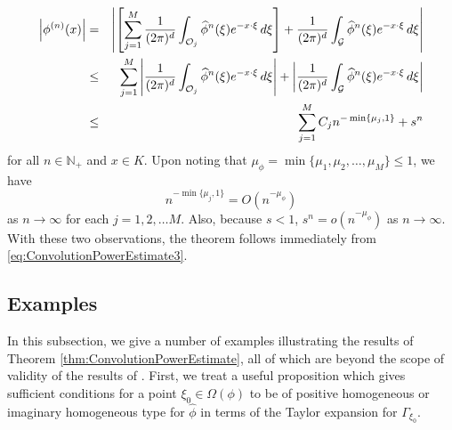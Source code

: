 \documentclass[smallextended]{svjour3}
\theoremstyle{remark}
\renewenvironment{proof}[1][\proofname]{\renewcommand\xproofname{#1}\xproof}{\endxproof}
\newcommand{\lb}{\left[}
\newcommand{\rb}{\right]}
\begin{document}
\begin{proof}[Proof of Theorem \ref{thm:ConvolutionPowerEstimate}]
\begin{eqnarray}\label{eq:ConvolutionPowerEstimate3}\nonumber
    \abs{\phi^{(n)}(x)}
    &=&\abs{\lb \sum_{j=1}^M\frac{1}{(2\pi)^d}\int_{\mathcal{O}_j}\widehat{\phi}^n(\xi)e^{-x\cdot\xi}\,d\xi \rb
    +\frac{1}{(2\pi)^d}\int_{\mathcal{G}}\widehat{\phi}^n(\xi)e^{-x\cdot\xi}\,d\xi}\\\nonumber
    &\leq&\sum_{j=1}^M\abs{\frac{1}{(2\pi)^d}\int_{\mathcal{O}_j}\widehat{\phi}^n(\xi)e^{-x\cdot\xi}\,d\xi}+\abs{\frac{1}{(2\pi)^d}\int_{\mathcal{G}}\widehat{\phi}^n(\xi)e^{-x\cdot\xi}\,d\xi}\\
    &\leq&\sum_{j=1}^M C_jn^{-\min\{\mu_j,1\}}+s^n
\end{eqnarray}
for all $n\in\mathbb{N}_+$ and $x\in K$. Upon noting that $\mu_\phi=\min\{\mu_1,\mu_2,\dots,\mu_M\}\leq 1$, we have
\begin{equation*}
    n^{-\min\{\mu_j,1\}}=O(n^{-\mu_\phi})
\end{equation*}
as $n\to\infty$ for each $j=1,2,\dots M$. Also, because $s<1$, $s^n=o(n^{-\mu_\phi})$ as $n\to \infty$. With these two observations, the theorem follows immediately from \eqref{eq:ConvolutionPowerEstimate3}.
\end{proof}



\subsection{Examples}\label{subsec:Examples}
In this subsection, we give a number of examples illustrating the results of Theorem \ref{thm:ConvolutionPowerEstimate}, all of which are beyond the scope of validity of the results of \cite{randles_convolution_2017}. First, we treat a useful proposition which gives sufficient conditions for a point $\xi_0\in\Omega(\phi)$ to be of positive homogeneous or imaginary homogeneous type for $\hat{\phi}$ in terms of the Taylor expansion for $\Gamma_{\xi_0}$.
\end{document}
